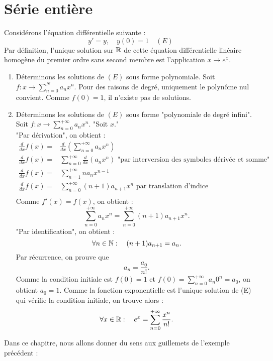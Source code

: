 \documentclass{book}
\begin{document}
%
\chapter*{Série entière}

\begin{Exemple}
Considérons l'équation différentielle suivante :
$$y' = y ,\quad y(0)=1\quad (E)$$
Par définition, l'unique solution sur $\mathbb{R}$ de cette équation différentielle linéaire homogène du premier ordre sans
second membre est l'application $x\to e^x$.\\
\begin{enumerate}
\item Déterminons les solutions de $(E)$ sous forme polynomiale.  Soit $f:x\to \sum_{n=0}^{N}a_n x^n$. Pour des raisons de
degré, uniquement le polynôme nul convient. Comme $f(0)=1$, il n'existe pas de solutions. 
\item Déterminons les solutions de $(E)$ sous forme "polynomiale de degré infini". Soit $f:x\to \sum_{n=0}^{+\infty}a_n x^n$.
"Soit $x$."\\ 
"Par dérivation", on obtient :
$$\begin{aligned}
\frac{d}{dx}f(x)=&\frac{d}{dx}(\sum_{n=0}^{+\infty}a_n x^n)\\
\frac{d}{dx}f(x)=&\sum_{n=0}^{+\infty}\frac{d}{dx}(a_n x^n) \text{ "par interversion des symboles dérivée et somme" }\\
\frac{d}{dx}f(x)=&\sum_{n=1}^{+\infty} n a_n x^{n-1} \\
\frac{d}{dx}f(x)=&\sum_{n=0}^{+\infty} (n+1) a_{n+1} x^{n}\text{ par translation d'indice } \\
\end{aligned}$$
Comme $f'(x)=f(x)$, on obtient :
$$\sum_{n=0}^{+\infty}a_n x^n=\sum_{n=0}^{+\infty} (n+1) a_{n+1} x^{n}.$$
"Par identification", on obtient :
$$ \forall n \in \mathbb{N}:\quad (n + 1)a_{n+1} = a_n.$$
Par récurrence, on prouve que $$a_n=\frac{a_0}{n!}.$$ Comme la condition initiale est $f(0)=1$ et  $f(0)= \sum_{n=0}^{+\infty}a_n 0^n=a_0$, on obtient $a_0=1$.  
Comme la fonction exponentielle est l'unique solution de (E) qui vérifie la condition initiale, on trouve alors :
$$\forall x \in \mathbb{R} :\quad e^x = \sum_{n=0}^{+\infty}  \frac{x^{n}}{n!}.$$
\end{enumerate}
Dans ce chapitre, nous allons donner du sens aux guillemets de l'exemple précédent :
\begin{enumerate}

\end{enumerate}
\end{Exemple}
\end{document}
